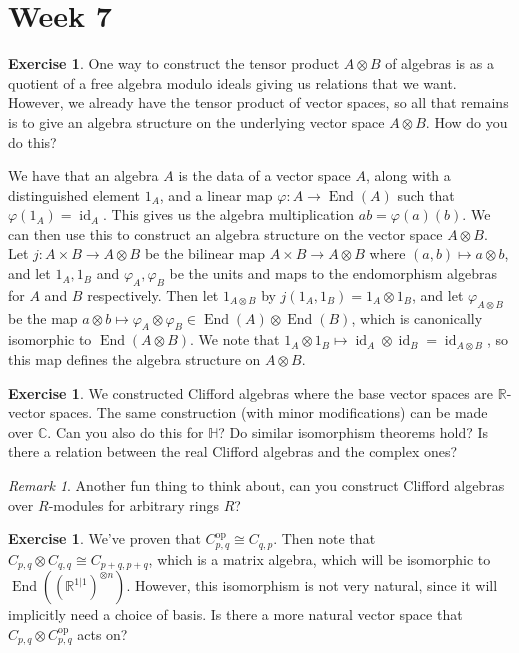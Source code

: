\documentclass[psamsfonts]{amsart}
\theoremstyle{definition}
\newtheorem{exer}[thm]{Exercise}
\theoremstyle{remark}
\newtheorem*{rem*}{Remark}
\newcommand{\R}{\mathbb{R}}
\newcommand{\C}{\mathbb{C}}
\DeclareMathOperator{\id}{id}
\DeclareMathOperator{\End}{End}
\begin{document}
\section*{Week 7}
%
\begin{exer}
One way to construct the tensor product $A \otimes B$ of algebras is as a quotient of a free algebra modulo ideals giving us relations that we want. However, we already have the tensor product of vector spaces, so all that remains is to give an algebra structure on the underlying vector space $A \otimes B$. How do you do this?
\end{exer}
We have that an algebra $A$ is the data of a vector space $A$, along with a distinguished element $1_A$, and a linear map $\varphi : A \to \End(A)$ such that $\varphi(1_A) = \id_A$. This gives us the algebra multiplication $ab = \varphi(a)(b)$. We can then use this to construct an algebra structure on the vector space $A \otimes B$. Let $j : A \times B \to A \otimes B$ be the bilinear map $A \times B \to A \otimes B$ where $(a,b) \mapsto a \otimes b$, and let $1_A,1_B$ and $\varphi_A,\varphi_B$ be the units and maps to the endomorphism algebras for $A$ and $B$ respectively. Then let $1_{A \otimes B}$ by $j(1_A, 1_B) = 1_A \otimes 1_B$, and let $\varphi_{A \otimes B}$ be the map $a \otimes b \mapsto \varphi_A \otimes \varphi_B \in \End(A) \otimes \End(B)$, which is canonically isomorphic to $\End(A \otimes B)$. We note that $1_A \otimes 1_B \mapsto \id_A \otimes \id_B = \id_{A \otimes B}$, so this map defines the algebra structure on $A \otimes B$.
%
\begin{exer}
We constructed Clifford algebras where the base vector spaces are $\R$-vector spaces. The same construction (with minor modifications) can be made over $\C$. Can you also do this for $\mathbb{H}$? Do similar isomorphism theorems hold? Is there a relation between the real Clifford algebras and the complex ones?
\end{exer}
\begin{rem*}
Another fun thing to think about, can you construct Clifford algebras over $R$-modules for arbitrary rings $R$?
\end{rem*}
%
\begin{exer}
We've proven that $C_{p,q}^{\text{op}} \cong C_{q,p}$. Then note that $C_{p,q} \otimes C_{q,q} \cong C_{p + q, p + q}$, which is a matrix algebra, which will be isomorphic to $\End((\R^{1|1})^{\otimes n})$. However, this isomorphism is not very natural, since it will implicitly need a choice of basis. Is there a more natural vector space that $C_{p,q} \otimes C^\text{op}_{p,q}$ acts on?
\end{exer}
\end{document}
